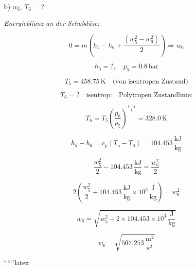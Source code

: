 b) $w_6$, $T_6$ = ?

\textit{Energieblianz an der Schubdüse:}

\[
0 = \dot{m} (h_5 - h_6 + \frac{(w_5^2 - w_6^2)}{2}) \Rightarrow w_6
\]

\[
h_5 = ?, \quad p_5 = 0.8 \, \text{bar}
\]

\[
T_5 = 458.75 \, \text{K} \quad \text{(von isentropen Zustand)}
\]

\[
T_6 = ? \quad \text{isentrop:} \quad \text{Polytropen Zustandlinie:}
\]

\[
T_6 = T_5 \left( \frac{p_6}{p_5} \right)^{\frac{k-1}{k}} = 328.0 \, \text{K}
\]

\[
h_5 - h_6 = c_p (T_5 - T_6) = 104.453 \, \frac{\text{kJ}}{\text{kg}}
\]

\[
\frac{w_5^2}{2} - 104.453 \, \frac{\text{kJ}}{\text{kg}} = \frac{w_6^2}{2}
\]

\[
2 \left( \frac{w_5^2}{2} + 104.453 \, \frac{\text{kJ}}{\text{kg}} \times 10^3 \, \frac{\text{J}}{\text{kg}} \right) = w_6^2
\]

\[
w_6 = \sqrt{w_5^2 + 2 \times 104.453 \times 10^3 \, \frac{\text{J}}{\text{kg}}}
\]

\[
w_6 = \sqrt{507.253 \, \frac{\text{m}^2}{\text{s}^2}}
\]

``````latex